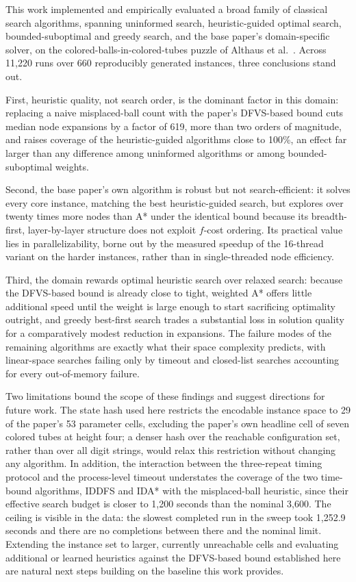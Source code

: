 \documentclass[letterpaper]{article}
\begin{document}
This work implemented and empirically evaluated a broad family of
classical search algorithms, spanning uninformed search, heuristic-guided
optimal search, bounded-suboptimal and greedy search, and the base paper's
domain-specific solver, on the colored-balls-in-colored-tubes puzzle
of Althaus et al.\ \cite{althaus2025}. Across 11,220 runs over 660
reproducibly generated instances, three conclusions stand out.

First, heuristic quality, not search order, is the dominant factor in this
domain: replacing a naive misplaced-ball count with the paper's DFVS-based
bound cuts median node expansions by a factor of 619, more than two orders
of magnitude, and raises coverage of the heuristic-guided algorithms close
to 100\%, an effect far larger than any difference among uninformed
algorithms or among bounded-suboptimal weights.

Second, the base paper's own algorithm is robust but not
search-efficient: it solves every core instance, matching the best
heuristic-guided search, but explores over twenty times more nodes than A*
under the identical bound because its breadth-first, layer-by-layer
structure does not exploit $f$-cost ordering. Its practical value lies in
parallelizability, borne out by the measured speedup of the 16-thread
variant on the harder instances, rather than in single-threaded node
efficiency.

Third, the domain rewards optimal heuristic search over relaxed search:
because the DFVS-based bound is already close to tight, weighted A* offers
little additional speed until the weight is large enough to start
sacrificing optimality outright, and greedy best-first search trades a
substantial loss in solution quality for a comparatively modest reduction
in expansions. The failure modes of the remaining algorithms are exactly
what their space complexity predicts, with linear-space searches failing
only by timeout and closed-list searches accounting for every
out-of-memory failure.

Two limitations bound the scope of these findings and suggest directions
for future work. The state hash used here restricts the encodable instance
space to 29 of the paper's 53 parameter cells, excluding the paper's own
headline cell of seven colored tubes at height four; a denser hash over the
reachable configuration set, rather than over all digit strings, would
relax this restriction without changing any algorithm. In addition, the
interaction between the three-repeat timing protocol and the process-level
timeout understates the coverage of the two time-bound algorithms, IDDFS
and IDA* with the misplaced-ball heuristic, since their effective search
budget is closer to 1,200 seconds than the nominal 3,600. The ceiling is
visible in the data: the slowest completed run in the sweep took 1,252.9
seconds and there are no completions between there and the nominal limit.
Extending the instance set to larger, currently unreachable cells and
evaluating additional or learned heuristics against the DFVS-based bound
established here are natural next steps building on the baseline this work
provides.



\end{document}

